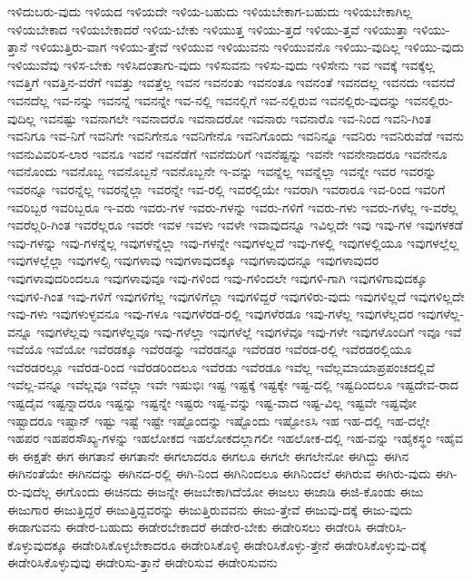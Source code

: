 {ಇಳಿದುಬರು-ವುದು
ಇಳಿಯದ
ಇಳಿಯದೇ
ಇಳಿಯ-ಬಹುದು
ಇಳಿಯಬೇಕಾಗ-ಬಹುದು
ಇಳಿಯಬೇಕಾಗಿಲ್ಲ
ಇಳಿಯಬೇಕಾದ
ಇಳಿಯಬೇಕಾದರೆ
ಇಳಿಯ-ಬೇಕು
ಇಳಿಯುತ್ತ
ಇಳಿಯು-ತ್ತದೆ
ಇಳಿಯು-ತ್ತವೆ
ಇಳಿಯುತ್ತಾ
ಇಳಿಯು-ತ್ತಾನೆ
ಇಳಿಯುತ್ತಿರು-ವಾಗ
ಇಳಿಯು-ತ್ತೇವೆ
ಇಳಿಯುವ
ಇಳಿಯುವನು
ಇಳಿಯುವನೊ
ಇಳಿಯು-ವುದಿಲ್ಲ
ಇಳಿಯು-ವುದು
ಇಳಿಯುವೆವು
ಇಳಿಸ-ಬೇಕು
ಇಳಿಸಿದಂತಾಗು-ವುದು
ಇಳಿಸುವನು
ಇಳಿಸು-ವುದು
ಇಳಿಸೇನು
ಇವ
ಇವಕ್ಕೆ
ಇವಕ್ಕೆಲ್ಲ
ಇವತ್ತಿಗೆ
ಇವತ್ತಿನ-ವರೆಗೆ
ಇವತ್ತು
ಇವತ್ತೆಲ್ಲ
ಇವನ
ಇವನಂತು
ಇವನಂತೂ
ಇವನಂತೆ
ಇವನದಲ್ಲ
ಇವನದು
ಇವನದೆ
ಇವನದೆಲ್ಲ
ಇವ-ನನ್ನು
ಇವನನ್ನೆ
ಇವನನ್ನೇ
ಇವ-ನಲ್ಲಿ
ಇವನಲ್ಲಿಗೆ
ಇವ-ನಲ್ಲಿರುವ
ಇವನಲ್ಲಿರು-ವುದನ್ನು
ಇವನಲ್ಲಿರು-ವುದಿಲ್ಲ
ಇವನಷ್ಟು
ಇವನಾಗಲೇ
ಇವನಾದರೊ
ಇವನಾದರೋ
ಇವನಾರು
ಇವನಾರೊ
ಇವ-ನಿಂದ
ಇವನಿ-ಗಿಂತ
ಇವನಿಗೂ
ಇವ-ನಿಗೆ
ಇವನಿಗೇ
ಇವನಿಗೇನೂ
ಇವನಿಗೇನೊ
ಇವನಿಗೊಂದು
ಇವನಿನ್ನೂ
ಇವನಿರು
ಇವನಿರುವೆಡೆ
ಇವನು
ಇವನುವಿವರಿಸ-ಲಾರ
ಇವನೂ
ಇವನೆ
ಇವನೆಡೆಗೆ
ಇವನೆದುರಿಗೆ
ಇವನೆಷ್ಟನ್ನು
ಇವನೇ
ಇವನೇನಾದರೂ
ಇವನೇನೂ
ಇವನೊಂದು
ಇವನೊಬ್ಬ
ಇವನೊಬ್ಬನೆ
ಇವನೊಬ್ಬನೇ
ಇ-ವನ್ನು
ಇವನ್ನೆಲ್ಲ
ಇವನ್ನೆಲ್ಲಾ
ಇವನ್ನೇ
ಇವರ
ಇವರನ್ನು
ಇವರನ್ನೂ
ಇವರನ್ನೆಲ್ಲ
ಇವರನ್ನೆಲ್ಲಾ
ಇವರನ್ನೇ
ಇವ-ರಲ್ಲಿ
ಇವರಲ್ಲಿಯೇ
ಇವರಾಗಿ
ಇವರಾರೂ
ಇವ-ರಿಂದ
ಇವರಿಗೆ
ಇವರಿಬ್ಬರ
ಇವರಿಬ್ಬರೂ
ಇ-ವರು
ಇವರು-ಗಳ
ಇವರು-ಗಳನ್ನು
ಇವರು-ಗಳಿಗೆ
ಇವರು-ಗಳು
ಇವರು-ಗಳೆಲ್ಲ
ಇ-ವರೆಲ್ಲ
ಇವರೆಲ್ಲರಿ-ಗಿಂತ
ಇವರೆಲ್ಲರೂ
ಇವರೇ
ಇವಳ
ಇವಳು
ಇವಳೇ
ಇವಾವುದನ್ನೂ
ಇವಿಲ್ಲದೇ
ಇವು
ಇವು-ಗಳ
ಇವುಗಳಕಡೆ
ಇವು-ಗಳನ್ನು
ಇವು-ಗಳನ್ನೆಲ್ಲ
ಇವುಗಳನ್ನೆಲ್ಲಾ
ಇವು-ಗಳನ್ನೇ
ಇವುಗಳಲ್ಲದೆ
ಇವು-ಗಳಲ್ಲಿ
ಇವುಗಳಲ್ಲಿಯೂ
ಇವುಗಳಲ್ಲೆಲ್ಲ
ಇವುಗಳಲ್ಲೆಲ್ಲಾ
ಇವುಗಳಲ್ಸಿ
ಇವುಗಳಾವು
ಇವುಗಳಾವುದಕ್ಕೂ
ಇವುಗಳಾವುದನ್ನೂ
ಇವುಗಳಾವುದರ
ಇವುಗಳಾವುದರಿಂದಲೂ
ಇವುಗಳಾವುವೂ
ಇವು-ಗಳಿಂದ
ಇವು-ಗಳಿಂದಲೇ
ಇವುಗಳಿ-ಗಾಗಿ
ಇವುಗಳಿಗಾವುದಕ್ಕೂ
ಇವುಗಳಿ-ಗಿಂತ
ಇವು-ಗಳಿಗೆ
ಇವುಗಳಿಗೆಲ್ಲ
ಇವುಗಳಿಗೆಲ್ಲಾ
ಇವುಗಳಿದ್ದರೆ
ಇವುಗಳಿರು-ವುದು
ಇವುಗಳಿಲ್ಲದೆ
ಇವುಗಳಿಲ್ಲದೇ
ಇವು-ಗಳು
ಇವುಗಳುಳ್ಳವನೂ
ಇವು-ಗಳೂ
ಇವುಗಳೆರಡ-ರಲ್ಲಿ
ಇವುಗಳೆರಡೂ
ಇವು-ಗಳೆಲ್ಲ
ಇವುಗಳೆಲ್ಲದರ
ಇವುಗಳೆಲ್ಲ-ವನ್ನೂ
ಇವುಗಳೆಲ್ಲವು
ಇವುಗಳೆಲ್ಲವೂ
ಇವು-ಗಳೆಲ್ಲಾ
ಇವುಗಳೆಲ್ಲೆ
ಇವುಗಳೆವೂ
ಇವು-ಗಳೇ
ಇವುಗಳೊಂದಿಗೆ
ಇವೂ
ಇವೆ
ಇವೆಯೊ
ಇವೆಯೋ
ಇವೆರಡಕ್ಕೂ
ಇವೆರಡನ್ನು
ಇವೆರಡನ್ನೂ
ಇವೆರಡರ
ಇವೆರಡ-ರಲ್ಲಿ
ಇವೆರಡರಲ್ಲಿಯೂ
ಇವೆರಡರಲ್ಲೂ
ಇವೆರಡ-ರಿಂದ
ಇವೆರಡರಿಂದಲೂ
ಇವೆರಡು
ಇವೆರಡೂ
ಇವೆಲ್ಲ
ಇವೆಲ್ಲಮಾಯಾಪ್ರಪಂಚದಲ್ಲಿವೆ
ಇವೆಲ್ಲ-ವನ್ನೂ
ಇವೆಲ್ಲವೂ
ಇವೆಲ್ಲಾ
ಇವೇ
ಇಷುಭಿಃ
ಇಷ್ಟ
ಇಷ್ಟಕ್ಕೆ
ಇಷ್ಟಕ್ಕೇ
ಇಷ್ಟ-ದಲ್ಲಿ
ಇಷ್ಟದಿಂದಲೂ
ಇಷ್ಟದೇವ-ರಾದ
ಇಷ್ಟದೈವ
ಇಷ್ಟನ್ನಾದರೂ
ಇಷ್ಟನ್ನು
ಇಷ್ಟನ್ನೇ
ಇಷ್ಟರು
ಇಷ್ಟ-ವನ್ನು
ಇಷ್ಟ-ವಾದ
ಇಷ್ಟ-ವಿಲ್ಲ
ಇಷ್ಟವೇ
ಇಷ್ಟವೋ
ಇಷ್ಟಾದರೂ
ಇಷ್ಟಾನ್
ಇಷ್ಟು
ಇಷ್ಟೆ
ಇಷ್ಟೇ
ಇಷ್ಟೊಂದನ್ನು
ಇಷ್ಟೊಂದು
ಇಷ್ಟೋಽಸಿ
ಇಹ
ಇಹ-ದಲ್ಲಿ
ಇಹ-ದಲ್ಲೇ
ಇಹಪರ
ಇಹಪರಸೌಖ್ಯ-ಗಳನ್ನು
ಇಹಲೋಕದ
ಇಹಲೋಕದಲ್ಲಾಗಲೀ
ಇಹಲೋಕ-ದಲ್ಲಿ
ಇಹ-ವನ್ನು
ಇಹೈಕಸ್ಥಂ
ಇಹೈವ
ಈ
ಈಕ್ಷತೇ
ಈಗ
ಈಗತಾನೆ
ಈಗತಾನೇ
ಈಗಲಾದರೂ
ಈಗಲೂ
ಈಗಲೇ
ಈಗಲೇನೋ
ಈಗಿದ್ದು
ಈಗಿನ
ಈಗಿನಂತೆಯೇ
ಈಗಿನದನ್ನು
ಈಗಿನದ-ರಲ್ಲಿ
ಈಗಿ-ನಿಂದ
ಈಗಿನಿಂದಲೂ
ಈಗಿನಿಂದಲೆ
ಈಗಿರುವ
ಈಗಿರು-ವುದು
ಈಗಿ-ರು-ವುದೆಲ್ಲ
ಈಗೊಂದು
ಈಚಿನದು
ಈಜನ್ನೇ
ಈಜಬೇಕಾಗಿದೆಯೋ
ಈಜಲು
ಈಜಾಡಿ
ಈಜಿ-ಕೊಂಡು
ಈಜು
ಈಜುಗಾರ
ಈಜುತ್ತಿದ್ದರೆ
ಈಜುತ್ತಿದ್ದವರನ್ನು
ಈಜುತ್ತಿರುವವನು
ಈಜು-ತ್ತೇವೆ
ಈಜುವು-ದಕ್ಕೆ
ಈಜು-ವುದು
ಈಡಾಗುವನು
ಈಡೇರ-ಬಹುದು
ಈಡೇರಬೇಕಾದರೆ
ಈಡೇರ-ಬೇಕು
ಈಡೇರಿಸಲು
ಈಡೇರಿಸಿ
ಈಡೇರಿಸಿ-ಕೊಳ್ಳುವುದಕ್ಕೂ
ಈಡೇರಿಸಿಕೊಳ್ಳಬೇಕಾದರೂ
ಈಡೇರಿಸಿಕೊಳ್ಳಿ
ಈಡೇರಿಸಿಕೊಳ್ಳು-ತ್ತೇನೆ
ಈಡೇರಿಸಿಕೊಳ್ಳುವು-ದಕ್ಕೆ
ಈಡೇರಿಸಿಕೊಳ್ಳುವುವು
ಈಡೇರಿಸು-ತ್ತಾನೆ
ಈಡೇರಿಸುವ
ಈಡೇರಿಸುವನು
}
